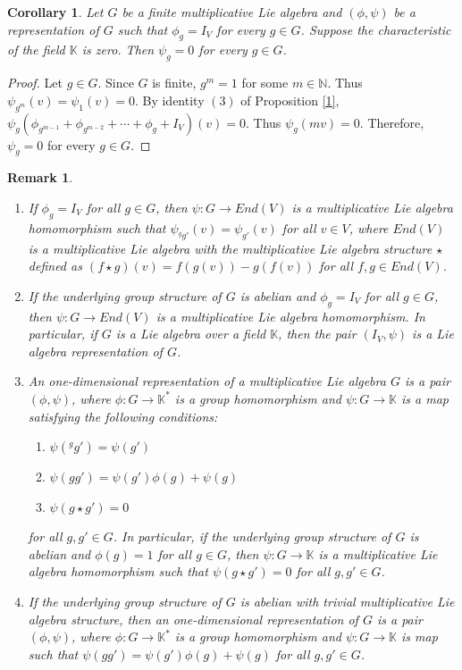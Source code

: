 \documentclass[10 pt,oneside,reqno,a4paper]{amsart}
\newtheorem{corollary}[theorem]{Corollary}
\newtheorem{remark}[theorem]{Remark}
\numberwithin{equation}{section}
\begin{document}
\begin{corollary}\label{3.2}
Let $G$ be a finite multiplicative Lie algebra and $(\phi,\psi)$ be a representation of $G$ such that $\phi_g = I_V$ for every $g\in G$. Suppose the characteristic of the field $\mathbb{K}$ is zero. Then $\psi_g = 0$ for every $g\in G$.
\end{corollary}
\begin{proof}
Let $g\in G$. Since $G$ is finite, $g^m = 1 $ for some $m\in \mathbb{N}$. Thus $\psi_{g^m}(v) = \psi_{1}(v) = 0$. By identity $(3)$ of Proposition \ref{1}, $\psi_{g}(\phi_{g^{m-1}} + \phi_{g^{m-2}}+ \cdots + \phi_g+ I_V) (v) = 0$. Thus $\psi_{g}(mv) = 0$. Therefore, $\psi_g = 0$ for every $g\in G$.
\end{proof}

\begin{remark}\label{2}
\begin{enumerate}
\item If $\phi_g = I_V$ for all $g\in G$, then $\psi : G \to End(V)$ is a multiplicative Lie algebra homomorphism such that $\psi_{^gg'}(v)=\psi_{g'}(v)$ for all $v\in V$, where $End(V)$ is a multiplicative Lie algebra with the multiplicative Lie algebra structure $\star$ defined as 
$(f\star g)(v) = f(g(v))- g(f(v))$ for all $f, g \in End(V)$.
\item If the underlying group structure of $G$ is abelian and $\phi_g = I_V$ for all $g\in G$, then $\psi : G \to End(V)$ is a multiplicative Lie algebra homomorphism. In particular, if $G$ is a Lie algebra over a field $\mathbb{K}$, then the pair $(I_V,\psi)$ is a Lie algebra representation of $G$. 

    \item An one-dimensional representation of a multiplicative Lie algebra $G$ is a pair $(\phi,\psi)$,  where  $\phi : G\to \mathbb{K}^{*}$ is a group homomorphism and $\psi : G \to \mathbb{K}$ is a map satisfying the following conditions:
\begin{enumerate}
    \item $\psi(^gg')= \psi(g')$
    \item $\psi(gg')= \psi({g'})\phi(g) + \psi(g)$
    \item $\psi(g \star g')=0$
\end{enumerate}
for all $g, g'\in G$.
In particular, if the underlying group structure of $G$ is abelian and $\phi(g) = 1$ for all $g\in G$, then   $\psi: G \to \mathbb{K}$ is a multiplicative Lie algebra homomorphism such that $\psi(g \star g') = 0$ for all $g, g'\in G$. 

\item If the underlying group structure of $G$ is abelian with trivial multiplicative Lie algebra structure, then an one-dimensional representation of $G$ is a pair $(\phi,\psi)$,  where  $\phi: G\to \mathbb{K}^{*}$ is a group homomorphism and $\psi: G \to \mathbb{K}$ is map such that $\psi(gg')= \psi(g')\phi(g) + \psi(g)$ for all $g,g'\in G$.
\end{enumerate}

\end{remark}
\end{document}

